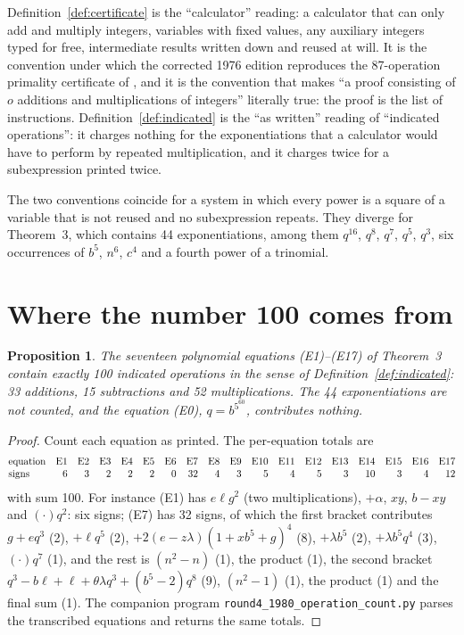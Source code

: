 \documentclass[11pt,letterpaper]{article}
\newtheorem{proposition}[theorem]{Proposition}
\theoremstyle{definition}
\theoremstyle{remark}
\numberwithin{equation}{section}
\newcommand{\file}[1]{\texttt{#1}}
\begin{document}
Definition~\ref{def:certificate} is the ``calculator'' reading: a calculator
that can only add and multiply integers, variables with fixed values, any
auxiliary integers typed for free, intermediate results written down and
reused at will. It is the convention under which the corrected 1976 edition
reproduces the 87-operation primality certificate of \cite[Theorem~5]{JSWW},
and it is the convention that makes ``a proof consisting of $o$ additions and
multiplications of integers'' literally true: the proof is the list of
instructions. Definition~\ref{def:indicated} is the ``as written'' reading of
``indicated operations'': it charges nothing for the exponentiations that a
calculator would have to perform by repeated multiplication, and it charges
twice for a subexpression printed twice.

The two conventions coincide for a system in which every power is a square of
a variable that is not reused and no subexpression repeats. They diverge for
Theorem~3, which contains 44 exponentiations, among them $q^{16}$, $q^8$,
$q^7$, $q^5$, $q^3$, six occurrences of $b^5$, $n^6$, $c^4$ and a fourth
power of a trinomial.

\section{Where the number 100 comes from}

\begin{proposition}\label{prop:100}
The seventeen polynomial equations \textup{(E1)--(E17)} of Theorem~3 contain
exactly 100 indicated operations in the sense of
Definition~\ref{def:indicated}: 33 additions, 15 subtractions and 52
multiplications. The 44 exponentiations are not counted, and the equation
\textup{(E0)}, $q=b^{5^{60}}$, contributes nothing.
\end{proposition}

\begin{proof}
Count each equation as printed. The per-equation totals are
\[
\begin{array}{@{}l*{17}{r}@{}}
\text{equation} & \text{E1}&\text{E2}&\text{E3}&\text{E4}&\text{E5}&\text{E6}&\text{E7}&\text{E8}&\text{E9}&\text{E10}&\text{E11}&\text{E12}&\text{E13}&\text{E14}&\text{E15}&\text{E16}&\text{E17}\\
\text{signs} & 6&3&2&2&2&0&32&4&3&5&4&5&3&10&3&4&12
\end{array}
\]
with sum 100. For instance (E1) has $e\ell g^2$ (two multiplications),
$+\alpha$, $xy$, $b-xy$ and $(\cdot)q^2$: six signs; (E7) has 32 signs, of
which the first bracket contributes $g+eq^3$ (2), $+\ell q^5$ (2),
$+2(e-z\lambda)(1+xb^5+g)^4$ (8), $+\lambda b^5$ (2), $+\lambda b^5q^4$ (3),
$(\cdot)q^7$ (1), and the rest is $(n^2-n)$ (1), the product (1), the second
bracket $q^3-b\ell+\ell+\theta\lambda q^3+(b^5-2)q^8$ (9), $(n^2-1)$ (1), the
product (1) and the final sum (1). The companion program
\file{round4\_1980\_operation\_count.py} parses the transcribed equations and
returns the same totals.
\end{proof}
\end{document}
